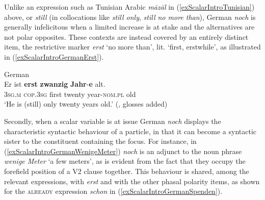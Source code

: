 Unlike an expression such as Tunisian Arabic \textit{māzāl} in (\ref{exScalarIntroTunisian}) above, or  \textit{still} (in collocations like \textit{still only}, \textit{still no more than}), German \textit{noch} is generally infelicitous when a limited increase is at stake and the alternatives are not polar opposites. These contexts are instead covered by an entirely distinct item, the restrictive marker \textit{erst} \lq no more than\rq{},  lit. \lq{}first, erstwhile\rq{}, as illustrated in (\ref{exScalarIntroGermanErst}).

\begin{exe}
	\ex German\label{exScalarIntroGermanErst}\\
	\gll Er ist \textbf{erst} \textbf{zwanzig} \textbf{Jahr}-\textbf{e} alt.\\
	3\textsc{sg}.\textsc{m} \textsc{cop}.3\textsc{sg} first twenty year-\textsc{nom}.\textsc{pl} old\\
	\glt \lq He is (still) only twenty years old.\rq{ }(\cite[s.v. \textit{erst}]{DWDS},  glosses added)
\end{exe}

Secondly, when a scalar variable is at issue German \textit{noch} displays the characteristic syntactic behaviour of a  particle, in that it can become a syntactic sister to the constituent containing the focus. For instance, in (\ref{exScalarIntroGermanWenigeMeter}) \textit{noch} is an adjunct to the noun phrase \textit{wenige Meter} \lq a few meters\rq{}, as is evident from the fact that they occupy the forefield position of a V2 clause together. This behaviour is shared, among the relevant expressions, with \textit{erst} and with the other phasal polarity items, as shown for the \textsc{already} expression \textit{schon} in (\ref{exScalarIntroGermanSpenden}).\pagebreak

